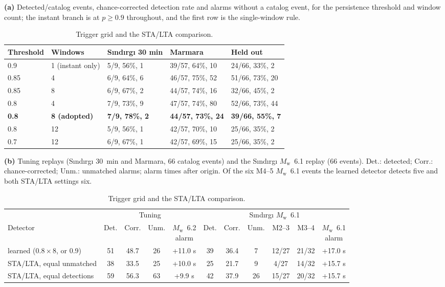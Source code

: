 \documentclass[11pt,a4paper]{article}
\newcommand{\Mw}{$M_\mathrm{w}$}
\newcommand{\stalta}{STA/LTA}
\newcommand{\panel}[1]{\par\smallskip\noindent\textbf{(#1)}\enskip}
\begin{document}
\begin{table}[htbp]
  \centering\footnotesize
  \caption{Trigger grid and the \stalta{} comparison.}\label{t:grid}
  \panel{a} Detected/catalog events, chance-corrected detection rate and alarms
  without a catalog event, for the persistence threshold and window count; the
  instant branch is at $p \geq 0.9$ throughout, and the first row is the single-window
  rule.\par\smallskip
  \begin{tabular}{@{}lllll@{}}
    \toprule
    Threshold & Windows & S\i{}nd\i{}rg\i{} 30 min & Marmara & Held out \\
    \midrule
    0.9  & 1 (instant only) & 5/9, 56\%, 1 & 39/57, 64\%, 10 & 24/66, 33\%, 2 \\
    0.85 & 4                & 6/9, 64\%, 6 & 46/57, 75\%, 52 & 51/66, 73\%, 20 \\
    0.85 & 8                & 6/9, 67\%, 2 & 44/57, 74\%, 16 & 32/66, 45\%, 2 \\
    0.8  & 4                & 7/9, 73\%, 9 & 47/57, 74\%, 80 & 52/66, 73\%, 44 \\
    \textbf{0.8} & \textbf{8 (adopted)} & \textbf{7/9, 78\%, 2} & \textbf{44/57, 73\%, 24} & \textbf{39/66, 55\%, 7} \\
    0.8  & 12               & 5/9, 56\%, 1 & 42/57, 70\%, 10 & 25/66, 35\%, 2 \\
    0.7  & 12               & 6/9, 67\%, 1 & 42/57, 69\%, 15 & 25/66, 35\%, 2 \\
    \bottomrule
  \end{tabular}

  \bigskip
  \panel{b} Tuning replays (S\i{}nd\i{}rg\i{} 30~min and Marmara, 66 catalog events)
  and the S\i{}nd\i{}rg\i{} \Mw{}~6.1 replay (66 events). Det.: detected; Corr.:
  chance-corrected; Unm.: unmatched alarms; alarm times after origin. Of the six M4--5
  \Mw{}~6.1 events the learned detector detects five and both \stalta{} settings
  six.\par\smallskip
  \setlength{\tabcolsep}{3.5pt}
  \begin{tabular}{@{}lcccccccccc@{}}
    \toprule
    & \multicolumn{4}{c}{Tuning} & \multicolumn{6}{c}{S\i{}nd\i{}rg\i{} \Mw{}~6.1} \\
    \cmidrule(lr){2-5}\cmidrule(lr){6-11}
    Detector & Det. & Corr. & Unm. & \makecell{\Mw{}~6.2\\alarm} & Det. & Corr. & Unm. &
    M2--3 & M3--4 & \makecell{\Mw{}~6.1\\alarm} \\
    \midrule
    learned ($0.8 \times 8$, or 0.9) & 51 & 48.7 & 26 & +11.0 s & 39 & 36.4 & 7  & 12/27 & 21/32 & +17.0 s \\
    \stalta{}, equal unmatched       & 38 & 33.5 & 25 & +10.0 s & 25 & 21.7 & 9  & 4/27  & 14/32 & +15.7 s \\
    \stalta{}, equal detections      & 59 & 56.3 & 63 & +9.9 s  & 42 & 37.9 & 26 & 15/27 & 20/32 & +15.7 s \\
    \bottomrule
  \end{tabular}
\end{table}
\end{document}
